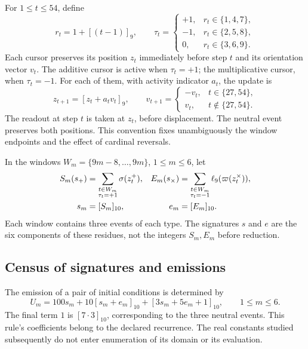 For $1\le t\le54$, define
\[
 r_t=1+[(t-1)]_9,
 \qquad
 \tau_t=
 \begin{cases}
 +1,&r_t\in\{1,4,7\},\\
 -1,&r_t\in\{2,5,8\},\\
 0,&r_t\in\{3,6,9\}.
 \end{cases}
\]
Each cursor preserves its position $z_t$ immediately before step
$t$ and its orientation vector $v_t$. The additive cursor is active
when $\tau_t=+1$; the multiplicative cursor, when $\tau_t=-1$. For each
of them, with activity indicator $a_t$, the update is
\begin{equation}
 z_{t+1}=[z_t+a_tv_t]_9,
 \qquad
 v_{t+1}=
 \begin{cases}
 -v_t,&t\in\{27,54\},\\
 v_t,&t\notin\{27,54\}.
 \end{cases}
 \label{iii:nf-actualizacion}
\end{equation}
The readout at step $t$ is taken at $z_t$, before displacement.
The neutral event preserves both positions. This convention fixes
unambiguously the window endpoints and the effect of
cardinal reversals.

In the windows $W_m=\{9m-8,\ldots,9m\}$, $1\le m\le6$, let
\begin{align}
 S_m(s_+)&=\sum_{\substack{t\in W_m\\\tau_t=+1}}
                 \sigma(z_t^+),&
 E_m(s_\times)&=\sum_{\substack{t\in W_m\\\tau_t=-1}}
                 \ell_9(\varpi(z_t^\times)),
 \label{iii:nf-firmas}\\
 s_m&=[S_m]_{10},&e_m&=[E_m]_{10}.\notag
\end{align}
Each window contains three events of each type. The signatures $s$ and $e$
are the six components of these residues, not the integers $S_m,E_m$
before reduction.

\subsection{Census of signatures and emissions}

The emission of a pair of initial conditions is determined by
\begin{equation}
 U_m=100s_m+10[s_m+e_m]_{10}+[3s_m+5e_m+1]_{10},
 \qquad 1\le m\le6.
 \label{iii:nf-emision}
\end{equation}
The final term $1$ is $[7\cdot3]_{10}$, corresponding to the three
neutral events. This rule's coefficients belong to the declared
recurrence. The real constants studied subsequently
do not enter enumeration of its domain or its evaluation.

